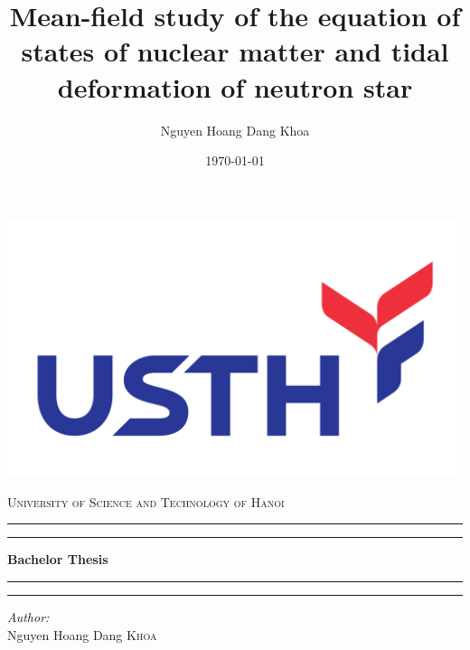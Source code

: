 \documentclass[a4paper,12pt]{report}
\author{Nguyen Hoang Dang Khoa}
\title{Mean-field study of the equation of states of nuclear matter and tidal deformation of neutron star}
\date{\today}
\theoremstyle{plain}\newtheorem{ques}{Question}
\theoremstyle{definition}\newtheorem*{ans}{Answer}
\begin{document}
        \begin{titlepage}
                \centering
                {\includegraphics[scale=0.08,valign=c]{logo/USTH_logo.png}\par}
                \vspace{0.3cm}
                {\scshape\Large University of Science and Technology of Hanoi \par}
                \vspace{6.3cm}
                \rule[-9pt]{\textwidth}{0.7pt}\par
                \rule{\textwidth}{1.6pt}\par
                \vspace{0.3cm}
                {\Huge\bfseries \thetitle\par}
                \vspace{0.2cm}
                {\Large\bfseries Bachelor Thesis\par}
                \vspace{0.3cm}
                \rule{\textwidth}{1.6pt}\par
                \rule[10pt]{\textwidth}{0.7pt}\par
                \vspace{0.5cm}
                \begin{minipage}[t]{0.45\textwidth}
                        \begin{flushleft}
                                \emph{Author:}\\
                                Nguyen Hoang Dang \textsc{Khoa}
                        \end{flushleft}
                \end{minipage}

\end{titlepage}
\end{document}

